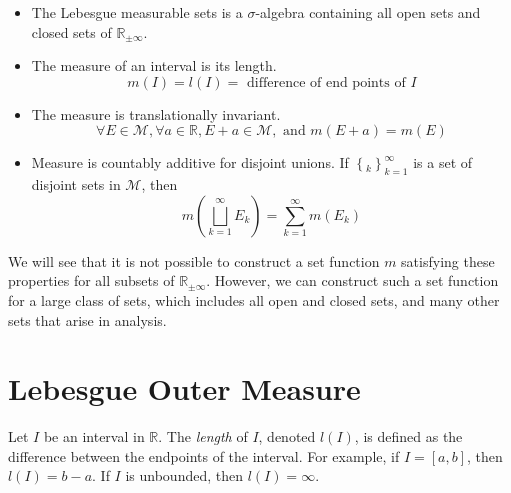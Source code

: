 \documentclass[../main.tex]{subfiles}
\begin{document}
\begin{itemize}
	\item The Lebesgue measurable sets is a $\sigma$-algebra containing all open sets and closed sets of $\mathbb{R}_{\pm \infty }$.
	\item The measure of an interval is its length.
		\begin{equation*}
			m(I) = l(I) = \text{ difference of end points of } I
		\end{equation*}
	\item The measure is translationally invariant.
		\begin{equation*}
			\forall E\in \mathcal{M}, \forall a\in \mathbb{R}, E+a\in \mathcal{M}, \text{ and } m(E+a) = m(E)
		\end{equation*}
	\item Measure is countably additive for disjoint unions. If $\left\{ _k \right\}_{k=1}^{\infty }$ is a set of disjoint sets in $\mathcal{M}$, then
		\begin{equation*}
			m\left( \bigsqcup_{k=1}^{\infty } E_k \right) = \sum_{k=1}^{\infty } m(E_k)
		\end{equation*}
\end{itemize}

We will see that it is not possible to construct a set function $m$ satisfying these properties for all subsets of $\mathbb{R}_{\pm \infty }$. However, we can construct such a set function for a large class of sets, which includes all open and closed sets, and many other sets that arise in analysis.

\section{Lebesgue Outer Measure}
Let $I$ be an interval in $\mathbb{R}$. The \emph{length} of $I$, denoted $l(I)$, is defined as the difference between the endpoints of the interval. For example, if $I = [a, b]$, then $l(I) = b - a$. If $I$ is unbounded, then $l(I) = \infty$.
\end{document}
